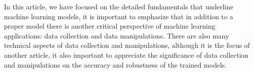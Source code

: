 
\par
In this article, we have focused on the detailed fundamentals that underline machine learning models, it is important to emphasize that in addition to a proper model  there is another critical perspective of machine learning applications: data collection and data manipulations. There are also many technical aspects of data collection and manipulations, although it is the focus of another article, it also important to appreciate the significance of data collection and manipulations on the accuracy and robustness of the trained models.
\par 
